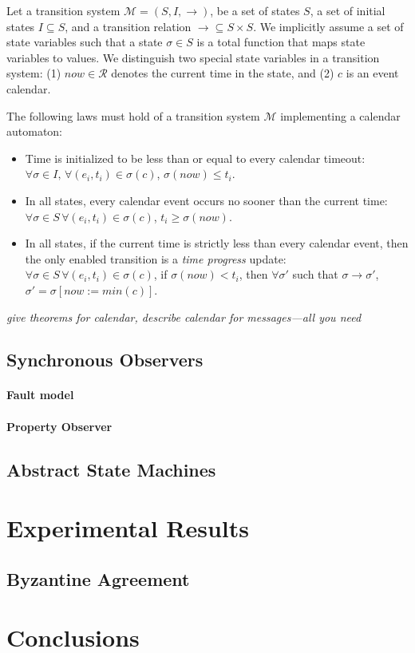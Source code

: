 \documentclass{IEEEtran/IEEEtran}
\begin{document}
Let a transition system $\mathcal{M} = (S, I, \rightarrow)$, be a set of states $S$, a set of initial states $I \subseteq S$, and a transition relation $\rightarrow \subseteq S \times S$. We implicitly assume a set of state variables such that a state $\sigma \in S$ is a total function that maps state variables to values. We distinguish two special state variables in a transition system: (1) $now \in \mathcal{R}$ denotes the current time in the state, and (2) $c$ is an event calendar.

The following laws must hold of a transition system $\mathcal{M}$ implementing a calendar automaton:

\begin{itemize}
\item Time is initialized to be less than or equal to every calendar timeout: $\forall \sigma \in I, \, \forall (e_i, t_i) \in \sigma(c)$, $\sigma(now) \leq t_i$.
\item In all states, every calendar event occurs no sooner than the current time: $\forall \sigma \in S \, \forall (e_i, t_i) \in \sigma(c)$, $t_i \geq \sigma(now)$.
\item In all states, if the current time is strictly less than every calendar event, then the only enabled transition is a \emph{time progress} update: $\forall \sigma \in S \, \forall (e_i, t_i) \in \sigma(c)$, if $\sigma(now) < t_i$, then $\forall \sigma'$ such that $\sigma \rightarrow \sigma'$, $\sigma' = \sigma[now := min(c)]$.
\end{itemize}

\emph{give theorems for calendar, describe calendar for messages---all you need}

\subsection{Synchronous Observers}\label{sec:sync}

\paragraph{Fault model}

\paragraph{Property Observer}

\subsection{Abstract State Machines}\label{sec:abstract}


\section{Experimental Results}\label{sec:experimental}

\subsection{Byzantine Agreement}\label{sec:byz}


\section{Conclusions}\label{sec:conclusions}
\end{document}
